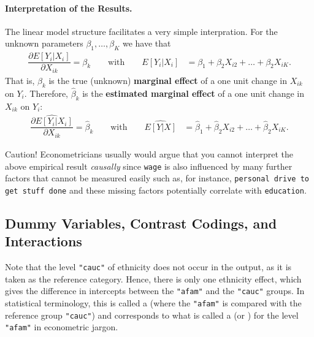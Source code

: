 \documentclass[
  14pt,
]{memoir}
\begin{document}
\paragraph*{Interpretation of the Results.}

The linear model structure facilitates a very simple
interpration. For the unknown parameters \(\beta_1, \dots,\beta_K\) we have that
\begin{align*}
\dfrac{\partial E[Y_i| X_i]}{\partial X_{ik}} = \beta_k\qquad\text{with}\qquad
E[Y_i | X_i] & = \beta_1 + \beta_2 X_{i2} + \dots + \beta_2 X_{iK}.
\end{align*}
That is, \(\beta_k\) is the true (unknown) \textbf{marginal effect} of a one unit change in \(X_{ik}\)
on \(Y_i\). Therefore, \(\hat\beta_k\) is the \textbf{estimated marginal effect} of a one unit change in
\(X_{ik}\) on \(Y_i\):
\begin{align*}
\widehat{\dfrac{\partial E[Y_i| X_i]}{\partial X_{ik}}} = \hat\beta_k\qquad\text{with}\qquad
\widehat{E[Y | X]} &= \hat\beta_1 + \hat\beta_2 X_{i2} + \dots + \hat\beta_2 X_{iK}.
\end{align*}

Caution! Econometricians usually would argue that you cannot interpret the above empirical
result \emph{causally} since \texttt{wage} is also influenced by many further factors that cannot be
measured easily such as, for instance, \texttt{personal drive to get stuff done} and these
missing factors potentially correlate with \texttt{education}.

\hypertarget{dummy-variables-contrast-codings-and-interactions}{%
\subsection*{Dummy Variables, Contrast Codings, and Interactions}\label{dummy-variables-contrast-codings-and-interactions}}

Note that the level \texttt{"cauc"} of ethnicity does not occur in the output, as it is taken as the reference category. Hence, there is only one ethnicity effect, which gives the difference in intercepts between the \texttt{"afam"} and the \texttt{"cauc"} groups. In statistical terminology, this is called a  (where the  \texttt{"afam"} is compared with the reference group \texttt{"cauc"}) and corresponds to what is called a  (or ) for the level \texttt{"afam"} in econometric jargon.
\end{document}
